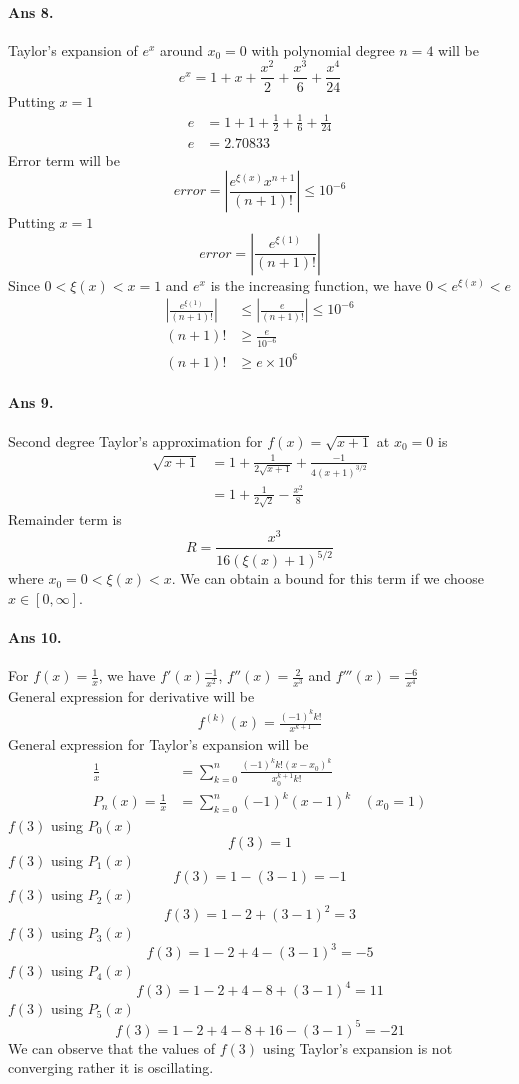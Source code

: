 \documentclass[12pt]{report}
\begin{document}
\paragraph*{Ans 8.} Taylor's expansion of $e^x$ around $x_0 = 0$ with polynomial degree $n = 4$ will be
$$ e^x = 1 + x + \frac{x^2}{2} + \frac{x^3}{6} + \frac{x^4}{24} $$
Putting $x = 1$
\begin{align*}
    e &= 1 + 1 + \frac{1}{2} + \frac{1}{6} + \frac{1}{24} \\
    e &= 2.70833
\end{align*}
Error term will be
$$ error = \left|\frac{e^{\xi(x)} x^{n+1}}{(n+1)!}\right| \leq 10^{-6}$$
Putting $x = 1$
$$ error = \left|\frac{e^{\xi(1)}}{(n+1)!}\right| $$
Since $0< \xi(x) < x = 1$ and $e^x$ is the increasing function, we have $ 0 < e^{\xi(x)} < e$ 
\begin{align*}
    \left|\frac{e^{\xi(1)}}{(n+1)!}\right| &\leq \left| \frac{e}{(n+1)!}\right| \leq 10^{-6}\\
    (n+1)! &\geq \frac{e}{10^{-6}}\\
    (n+1)! &\geq e \times 10^6
\end{align*}
\paragraph*{Ans 9.} Second degree Taylor's approximation for $f(x) = \sqrt{x+1}$ at $x_0 = 0$ is 
\begin{align*}
    \sqrt{x+1} &= 1 + \frac{1}{2\sqrt{x+1}} + \frac{-1}{4(x+1)^{3/2}}\\
    &= 1 + \frac{1}{2\sqrt{2}} - \frac{x^2}{8}
\end{align*}
Remainder term is 
$$ R = \frac{x^3}{16(\xi(x)+1)^{5/2}}$$
where $x_0 = 0 < \xi(x) < x$.
We can obtain a bound for this term if we choose $x \in [0, \infty]$.

\paragraph*{Ans 10.} For $f(x) = \frac{1}{x}$, we have $f'(x) \frac{-1}{x^2}$, $f''(x) = \frac{2}{x^3}$ and $f'''(x) = \frac{-6}{x^4}$\\
General expression for derivative will be
\begin{align*}
    f^{(k)}(x) = \frac{(-1)^k k!}{x^{k+1}}
\end{align*}
General expression for Taylor's expansion will be
\begin{align*}
    \frac{1}{x} &= \sum\limits_{k=0}^{n}\frac{(-1)^k k!(x-x_0)^k}{x_0^{k+1}k!}\\
    P_n(x) = \frac{1}{x} &= \sum\limits_{k=0}^{n}(-1)^k (x-1)^k~~~~ (x_0 = 1)
\end{align*}
$f(3)$ using $P_0(x)$
$$ f(3) = 1$$
$f(3)$ using $P_1(x)$
$$ f(3) = 1 - (3 - 1) = -1$$
$f(3)$ using $P_2(x)$
$$ f(3) = 1 - 2 + (3 - 1)^2 = 3$$
$f(3)$ using $P_3(x)$
$$ f(3) = 1-2+4-(3-1)^3 = -5$$
$f(3)$ using $P_4(x)$
$$ f(3) = 1-2+4-8+(3-1)^4 = 11$$
$f(3)$ using $P_5(x)$
$$ f(3) = 1-2+4-8+16-(3-1)^5 = -21$$
We can observe that the values of $f(3)$ using Taylor's expansion is not converging rather it is oscillating. 
\end{document}

